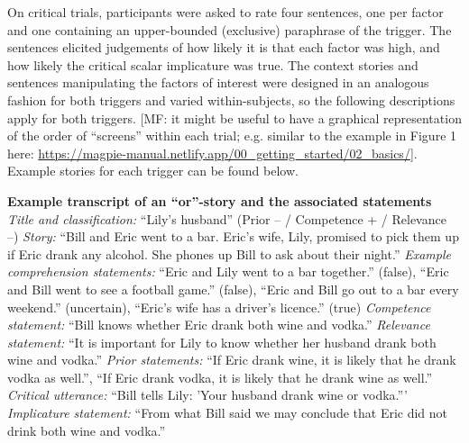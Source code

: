 \documentclass{sp}
\newcommand{\mf}[1]{\textcolor{BurntOrange}{[MF: #1]}}
\begin{document}
On critical trials, participants were asked to rate four sentences, one per factor and one containing an upper-bounded (exclusive) paraphrase of the trigger. The sentences elicited judgements of how likely it is that each factor was high, and how likely the critical scalar implicature was true. The context stories and sentences manipulating the factors of interest were designed in an analogous fashion for both triggers and varied within-subjects, so the following descriptions apply for both triggers.
\mf{it might be useful to have a graphical representation of the order of ``screens'' within each trial; e.g. similar to the example in Figure 1 here: \url{https://magpie-manual.netlify.app/00_getting_started/02_basics/}}. Example stories for each trigger can be found below.

\begin{exe}
\ex	\textbf{Example transcript of an ``or''-story and the associated statements}\newline
\textit{Title and classification:} ``Lily's husband'' (Prior -- / Competence + / Relevance --)\newline
\textit{Story:} ``Bill and Eric went to a bar. Eric’s wife, Lily, promised to pick them up if Eric drank any alcohol. She phones up Bill to ask about their night.''\newline
\textit{Example comprehension statements:} ``Eric and Lily went to a bar together.'' (false), ``Eric and Bill went to see a football game.'' (false), ``Eric and Bill go out to a bar every weekend.'' (uncertain), ``Eric's wife has a driver’s licence.'' (true)\newline
\textit{Competence statement:} ``Bill knows whether Eric drank both wine and vodka.''\newline
\textit{Relevance statement:} ``It is important for Lily to know whether her husband drank both wine and vodka.''\newline
\textit{Prior statements:} ``If Eric drank wine, it is likely that he drank vodka as well.'', ``If Eric drank vodka, it is likely that he drank wine as well.''\newline
\textit{Critical utterance:} ``Bill tells Lily: 'Your husband drank wine or vodka.'''\newline
\textit{Implicature statement:} ``From what Bill said we may conclude that Eric did not drink both wine and vodka.''
\end{exe}
\end{document}
